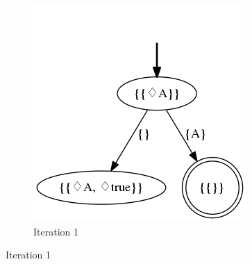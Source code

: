 \begin{example}
\begin{figure}[h]
\begin{subfigure}[b]{0.50\textwidth}
			\includegraphics[width=\textwidth]{images/on-the-fly-eventually-A-it-1}
			\caption{Iteration 1}
			\label{fig:exa-on-the-fly-eventually-A-it-1}
		\end{subfigure}
		

\end{figure}
\end{example}
